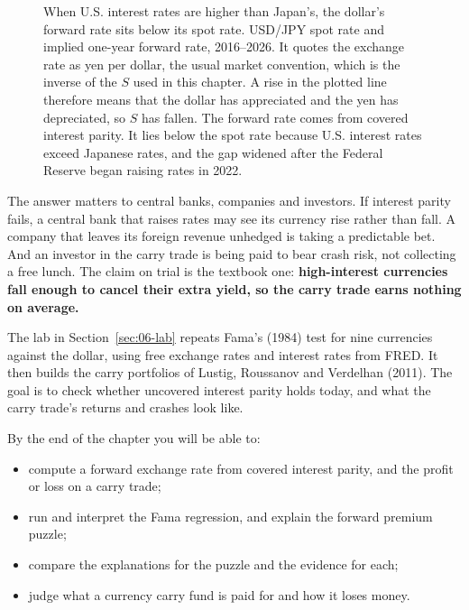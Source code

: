 \begin{figure}[htbp]
{%
}
\caption{When U.S. interest rates are higher than Japan's, the dollar's forward rate sits below its spot rate. USD/JPY spot rate and implied one-year forward rate, 2016--2026. 
It quotes the exchange rate as yen per dollar, the usual market convention, which is the inverse of the $S$ used in this chapter. A rise in the plotted line therefore means that the dollar has appreciated and the yen has depreciated, so $S$ has fallen.
The forward rate comes from covered interest parity. It lies below the spot rate because U.S. interest rates exceed Japanese rates, and the gap widened after the Federal Reserve began raising rates in 2022.}
\label{fig:06-usdjpy}
\end{figure}


The answer matters to central banks, companies and investors. If interest parity fails, a central bank that raises rates may see its currency rise rather than fall. A company that leaves its foreign revenue unhedged is taking a predictable bet. And an investor in the carry trade is being paid to bear crash risk, not collecting a free lunch. The claim on trial is the textbook one: \textbf{high-interest currencies fall enough to cancel their extra yield, so the carry trade earns nothing on average.}

The lab in Section~\ref{sec:06-lab} repeats Fama's (1984) test for nine currencies against the dollar, using free exchange rates and interest rates from FRED. It then builds the carry portfolios of Lustig, Roussanov and Verdelhan (2011). The goal is to check whether uncovered interest parity holds today, and what the carry trade's returns and crashes look like.

By the end of the chapter you will be able to:

\begin{itemize}
  \item compute a forward exchange rate from covered interest parity, and the profit or loss on a carry trade;
  \item run and interpret the Fama regression, and explain the forward premium puzzle;
  \item compare the explanations for the puzzle and the evidence for each;
  \item judge what a currency carry fund is paid for and how it loses money.
\end{itemize}


